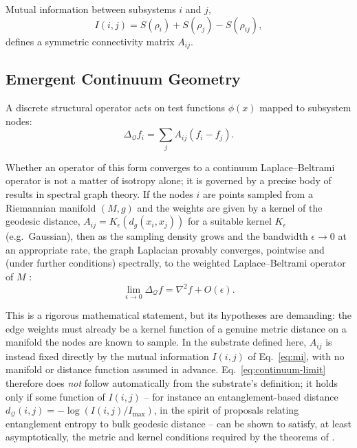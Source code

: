 \documentclass[11pt]{article}
\begin{document}
Mutual information between subsystems $i$ and $j$,
\begin{equation}
I(i,j) = S(\rho_i) + S(\rho_j) - S(\rho_{ij}),
\label{eq:mi}
\end{equation}
defines a symmetric connectivity matrix $A_{ij}$.

\subsection{Emergent Continuum Geometry}
\label{sec:continuum-geometry}

A discrete structural operator acts on test functions $\phi(x)$ mapped to subsystem nodes:
\begin{equation}
\Delta_\mathcal{Q} f_i = \sum_j A_{ij} (f_i - f_j).
\label{eq:discrete-op}
\end{equation}

Whether an operator of this form converges to a continuum Laplace--Beltrami operator is not a matter of isotropy alone; it is governed by a precise body of results in spectral graph theory. If the nodes $i$ are points sampled from a Riemannian manifold $(M,g)$ and the weights are given by a kernel of the geodesic distance, $A_{ij} = K_\epsilon(d_g(x_i,x_j))$ for a suitable kernel $K_\epsilon$ (e.g.\ Gaussian), then as the sampling density grows and the bandwidth $\epsilon\to0$ at an appropriate rate, the graph Laplacian provably converges, pointwise and (under further conditions) spectrally, to the weighted Laplace--Beltrami operator of $M$ \cite{BelkinNiyogi,Singer}:
\begin{equation}
\lim_{\epsilon\to0} \Delta_\mathcal{Q} f = \nabla^2 f + O(\epsilon).
\label{eq:continuum-limit}
\end{equation}

This is a rigorous mathematical statement, but its hypotheses are demanding: the edge weights must already be a kernel function of a genuine metric distance on a manifold the nodes are known to sample. In the substrate defined here, $A_{ij}$ is instead fixed directly by the mutual information $I(i,j)$ of Eq.~\eqref{eq:mi}, with no manifold or distance function assumed in advance. Eq.~\eqref{eq:continuum-limit} therefore does \emph{not} follow automatically from the substrate's definition; it holds only if some function of $I(i,j)$ -- for instance an entanglement-based distance $d_\mathcal{Q}(i,j) = -\log\left(I(i,j)/I_{\max}\right)$, in the spirit of proposals relating entanglement entropy to bulk geodesic distance \cite{VanRaamsdonk} -- can be shown to satisfy, at least asymptotically, the metric and kernel conditions required by the theorems of \cite{BelkinNiyogi,Singer}.
\end{document}
